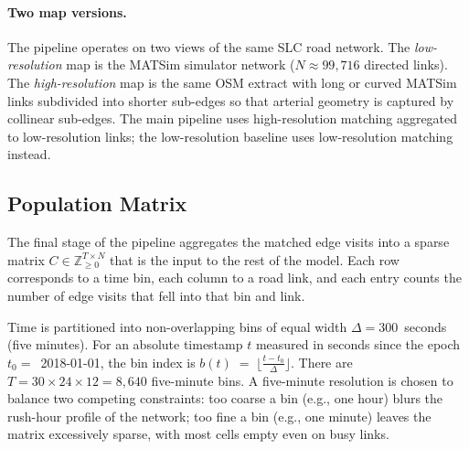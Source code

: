 \documentclass[sigconf, review]{acmart}
\begin{document}
\paragraph{Two map versions.}
The pipeline operates on two views of the same SLC road
network. The \emph{low-resolution} map is the MATSim simulator
network ($N \approx 99{,}716$ directed links). The
\emph{high-resolution} map is the same OSM extract with long or
curved MATSim links subdivided into shorter sub-edges so that
arterial geometry is captured by collinear sub-edges. The main
pipeline uses high-resolution matching aggregated to
low-resolution links; the low-resolution baseline uses
low-resolution matching instead.


\subsection{Population Matrix}
\label{sec:counting}

The final stage of the pipeline aggregates the matched edge visits
into a sparse matrix $C \in \mathbb{Z}_{\ge 0}^{T \times N}$ that is the input
to the rest of the model. Each row corresponds to a time bin, each
column to a road link, and each entry counts the number of edge
visits that fell into that bin and link.


Time is partitioned into non-overlapping bins of equal width
$\Delta = 300$~seconds (five minutes). For an absolute timestamp
$t$ measured in seconds since the epoch $t_0 = $~2018-01-01, the
bin index is
$
b(t) \;=\; \Big\lfloor \frac{t - t_0}{\Delta} \Big\rfloor.
$
There are $T = 30 \times 24 \times 12 = 8{,}640$ five-minute
bins.
A five-minute resolution is chosen to balance two competing
constraints: too coarse a bin (e.g., one hour) blurs the rush-hour
profile of the network; too fine a bin (e.g., one minute) leaves
the matrix excessively sparse, with most cells empty even on busy
links.

\end{document}
